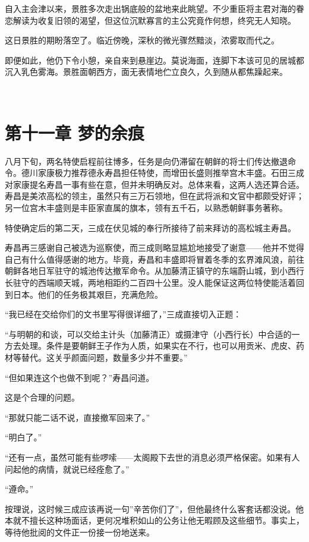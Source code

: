 \documentclass[
]{article}
\begin{document}
自入主会津以来，景胜多次走出锅底般的盆地来此眺望。不少重臣将主君对海的眷恋解读为收复旧领的渴望，但这位沉默寡言的主公究竟作何想，终究无人知晓。

这日景胜的期盼落空了。临近傍晚，深秋的微光骤然黯淡，浓雾取而代之。

即便如此，他仍下令小憩，亲自来到悬崖边。莫说海面，连脚下本该可见的居城都沉入乳色雾海。景胜面朝西方，面无表情地伫立良久，久到随从都焦躁起来。

  

\section*{第十一章 梦的余痕}\label{ux7b2cux5341ux4e00ux7ae0-ux68a6ux7684ux4f59ux75d5}

八月下旬，两名特使启程前往博多，任务是向仍滞留在朝鲜的将士们传达撤退命令。德川家康极力推荐德永寿昌担任特使，而增田长盛则推举宫木丰盛。石田三成对家康提名寿昌一事有些在意，但并未明确反对。总体来看，这两人选还算合适。寿昌是美浓高松的领主，虽然只有三万石领地，但在武将派和文官中都颇受好评；另一位宫木丰盛则是丰臣家直属的旗本，领有五千石，以熟悉朝鲜事务著称。

特使确定后的第二天，三成在伏见城的奉行所接待了前来拜访的高松城主寿昌。

寿昌再三感谢自己被选为巡察使，而三成则略显尴尬地接受了谢意------他并不觉得自己有什么值得感谢的地方。毕竟，寿昌和丰盛即将冒着冬季的玄界滩风浪，前往朝鲜各地日军驻守的城池传达撤军命令。从加藤清正镇守的东端蔚山城，到小西行长驻守的西端顺天城，两地相距约二百四十公里。没人能保证这两位特使能活着回到日本。他们的任务极其艰巨，充满危险。

``我已经在交给你们的文书里写得很详细了，''三成直接切入正题：

``与明朝的和谈，可以交给主计头（加藤清正）或摄津守（小西行长）中合适的一方去处理。条件是要朝鲜王子作为人质，如果实在不行，也可以用贡米、虎皮、药材等替代。这关乎颜面问题，数量多少并不重要。''

``但如果连这个也做不到呢？''寿昌问道。

这是个合理的问题。

``那就只能二话不说，直接撤军回来了。''

``明白了。''

``还有一点，虽然可能有些啰嗦------太阁殿下去世的消息必须严格保密。如果有人问起他的病情，就说已经痊愈了。''

``遵命。''

按理说，这时候三成应该再说一句''辛苦你们了''，但他最终什么客套话都没说。他本就不擅长这种场面话，更何况堆积如山的公务让他无暇顾及这些细节。事实上，等待他批阅的文件正一份接一份地送来。
\end{document}
